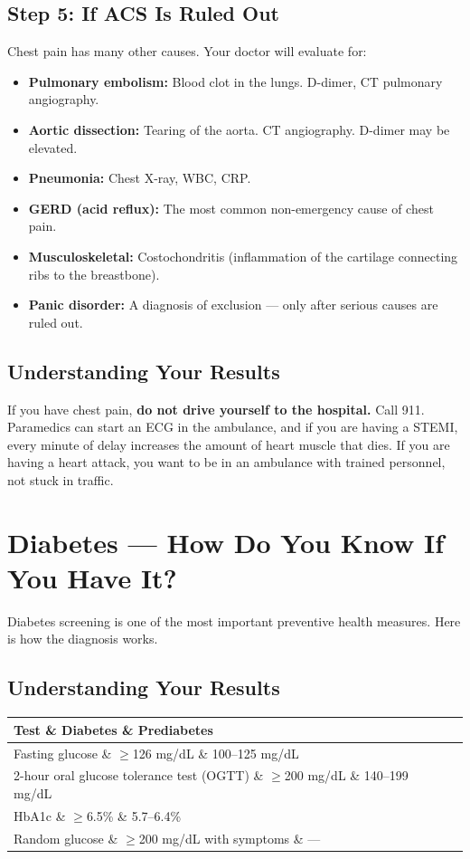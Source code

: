 \subsection{Step 5: If ACS Is Ruled Out}

Chest pain has many other causes. Your doctor will evaluate for:
\begin{itemize}
    \item \textbf{Pulmonary embolism:} Blood clot in the lungs. D-dimer, CT pulmonary angiography.
    \item \textbf{Aortic dissection:} Tearing of the aorta. CT angiography. D-dimer may be elevated.
    \item \textbf{Pneumonia:} Chest X-ray, WBC, CRP.
    \item \textbf{GERD (acid reflux):} The most common non-emergency cause of chest pain.
    \item \textbf{Musculoskeletal:} Costochondritis (inflammation of the cartilage connecting ribs to the breastbone).
    \item \textbf{Panic disorder:} A diagnosis of exclusion --- only after serious causes are ruled out.
\end{itemize}

\subsection{Understanding Your Results}

If you have chest pain, \textbf{do not drive yourself to the hospital.} Call 911. Paramedics can start an ECG in the ambulance, and if you are having a STEMI, every minute of delay increases the amount of heart muscle that dies. If you are having a heart attack, you want to be in an ambulance with trained personnel, not stuck in traffic.

\clearpage
\section{Diabetes --- How Do You Know If You Have It?}

Diabetes screening is one of the most important preventive health measures. Here is how the diagnosis works.

\subsection{Understanding Your Results}

\begin{longtable}{@{}lll@{}}
\toprule
\textbf{Test} \& \textbf{Diabetes} \& \textbf{Prediabetes} \\
\midrule
Fasting glucose \& $\geq$126 mg/dL \& 100--125 mg/dL \\
2-hour oral glucose tolerance test (OGTT) \& $\geq$200 mg/dL \& 140--199 mg/dL \\
HbA1c \& $\geq$6.5\% \& 5.7--6.4\% \\
Random glucose \& $\geq$200 mg/dL with symptoms \& --- \\
\bottomrule
\end{longtable}

